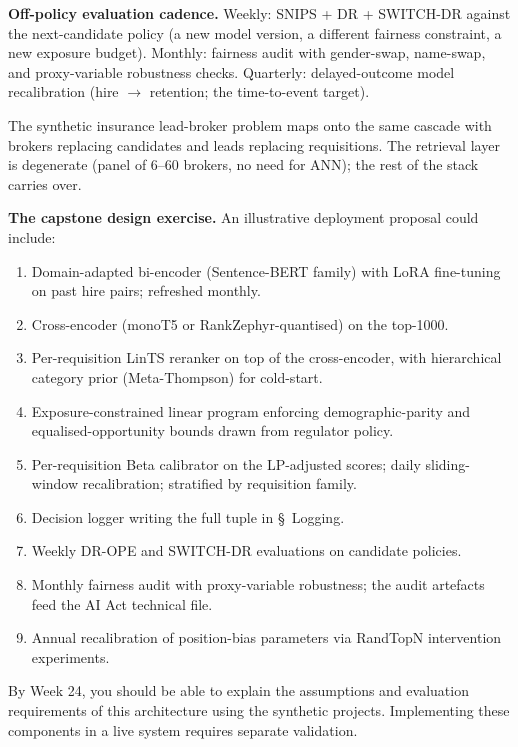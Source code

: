 \documentclass[11pt,oneside]{scrbook}
\begin{document}
\begin{matching}
\textbf{Off-policy evaluation cadence.} Weekly: SNIPS + DR + SWITCH-DR
against the next-candidate policy (a new model version, a different
fairness constraint, a new exposure budget). Monthly: fairness audit with
gender-swap, name-swap, and proxy-variable robustness checks. Quarterly:
delayed-outcome model recalibration (hire $\to$ retention; the time-to-event
target).

The synthetic insurance lead-broker problem maps onto the same cascade with brokers
replacing candidates and leads replacing requisitions. The retrieval layer
is degenerate (panel of 6--60 brokers, no need for ANN); the rest of the
stack carries over.

\textbf{The capstone design exercise.} An illustrative deployment proposal
could include:
\begin{enumerate}\setlength\itemsep{0pt}
  \item Domain-adapted bi-encoder (Sentence-BERT family) with LoRA fine-tuning
        on past hire pairs; refreshed monthly.
  \item Cross-encoder (monoT5 or RankZephyr-quantised) on the top-1000.
  \item Per-requisition LinTS reranker on top of the cross-encoder, with
        hierarchical category prior (Meta-Thompson) for cold-start.
  \item Exposure-constrained linear program enforcing demographic-parity and
        equalised-opportunity bounds drawn from regulator policy.
  \item Per-requisition Beta calibrator on the LP-adjusted scores; daily
        sliding-window recalibration; stratified by requisition family.
  \item Decision logger writing the full tuple in \S~Logging.
  \item Weekly DR-OPE and SWITCH-DR evaluations on candidate policies.
  \item Monthly fairness audit with proxy-variable robustness; the audit
        artefacts feed the AI Act technical file.
  \item Annual recalibration of position-bias parameters via RandTopN
        intervention experiments.
\end{enumerate}

By Week 24, you should be able to explain the assumptions and evaluation
requirements of this architecture using the synthetic projects. Implementing
these components in a live system requires separate validation.
\end{matching}
\end{document}
